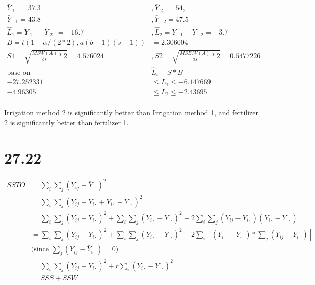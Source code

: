 \documentclass{article}\usepackage[]{graphicx}\usepackage[]{color}
\begin{document}
\begin{enumerate}[(a)]
\begin{displaymath}
\begin{split}
\bar{Y}_{\cdot 1 \cdot} =37.3&, \bar{Y}_{\cdot 2 \cdot} = 54 ,\\
\bar{Y}_{\cdot \cdot 1} =43.8 &, \bar{Y}_{\cdot \cdot 2} = 47.5 \\
\hat{L}_1 = \bar{Y}_{\cdot 1 \cdot}-\bar{Y}_{\cdot 2 \cdot}  = -16.7 &,  
\hat{L}_2 = \bar{Y}_{\cdot \cdot 1}-\bar{Y}_{\cdot \cdot 2} =-3.7\\ 
B = t(1-\alpha/(2*2), a(b-1)(s-1)) &=2.306004\\
S1 = \sqrt{\frac{MSW(A)}{bs}*2} = 4.576024 &,
S2 = \sqrt{\frac{MSB.W(A)}{as}*2} = 0.5477226 \\
\text{base on} &\hat{L}_i \pm S*B\\
-27.252331 & \leq L_1 \leq -6.147669  \\
-4.96305 &\leq L_2 \leq -2.43695 \\
\end{split}
\end{displaymath}

\qquad Irrigation method 2 is significantly better than Irrigation method 1, and fertilizer 2 is significantly better than fertilizer 1.

\end{enumerate}

\section{27.22}

\begin{displaymath}
\begin{split}
SSTO &= \sum_i \sum_j (Y_{ij}-\bar{Y}_{\cdot \cdot})^2 \\
     &= \sum_i \sum_j (Y_{ij} -\bar{Y}_{i\cdot} + \bar{Y}_{i\cdot} -\bar{Y}_{\cdot \cdot})^2 \\
     &= \sum_i \sum_j (Y_{ij} -\bar{Y}_{i\cdot})^2 + \sum_i \sum_j (\bar{Y}_{i\cdot} -\bar{Y}_{\cdot \cdot})^2 + 2\sum_i \sum_j(Y_{ij} -\bar{Y}_{i\cdot})(\bar{Y}_{i\cdot}-\bar{Y}_{\cdot \cdot})\\
     &= \sum_i \sum_j (Y_{ij} -\bar{Y}_{i\cdot})^2 + \sum_i \sum_j (\bar{Y}_{i\cdot} -\bar{Y}_{\cdot \cdot})^2 + 2\sum_i [(\bar{Y}_{i\cdot}-\bar{Y}_{\cdot \cdot})*\sum_j (Y_{ij} -\bar{Y}_{i\cdot})]\\
     &\text{(since } \sum_j (Y_{ij} -\bar{Y}_{i\cdot})=0 \text{)}\\
     &= \sum_i \sum_j (Y_{ij} -\bar{Y}_{i\cdot})^2 + r\sum_i (\bar{Y}_{i\cdot} -\bar{Y}_{\cdot \cdot})^2\\
     &= SSS + SSW
\end{split}
\end{displaymath}
\end{document}
